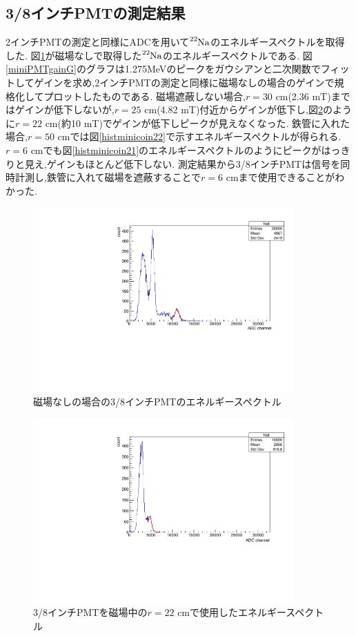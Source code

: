 \subsection{3/8インチPMTの測定結果}

2インチPMTの測定と同様にADCを用いて$\ce{^{22}Na}$のエネルギースペクトルを取得した.
図\ref{histminicoincidence2}が磁場なしで取得した$\ce{^{22}Na}$のエネルギースペクトルである.
図\ref{miniPMTgainG}のグラフは1.275MeVのピークをガウシアンと二次関数でフィットしてゲインを求め,2インチPMTの測定と同様に磁場なしの場合のゲインで規格化してプロットしたものである.
磁場遮蔽しない場合,$r=30$ cm(2.36 mT)まではゲインが低下しないが,$r=25$ cm(4.82 mT)付近からゲインが低下し,図\ref{histminicoout22}のように$r=22$ cm(約10 mT)でゲインが低下しピークが見えなくなった.
鉄管に入れた場合,$r=50$ cmでは図\ref{histminicoin22}で示すエネルギースペクトルが得られる.$r=6$ cmでも図\ref{histminicoin21}のエネルギースペクトルのようにピークがはっきりと見え,ゲインもほとんど低下しない.
測定結果から3/8インチPMTは信号を同時計測し,鉄管に入れて磁場を遮蔽することで$r=6$ cmまで使用できることがわかった.

\begin{figure}[tbp]
	\centering
		\includegraphics[angle=-90,width=10cm]{fig/iguchi/minicoincidence2.pdf}
	\caption{磁場なしの場合の3/8インチPMTのエネルギースペクトル}
	\label{histminicoincidence2}
\end{figure}

\begin{figure}[tbp]
	\centering
		\includegraphics[angle=-90,width=10cm]{fig/iguchi/minicoout22.pdf}
	\caption{3/8インチPMTを磁場中の$r=22$ cmで使用したエネルギースペクトル}
	\label{histminicoout22}
\end{figure}


